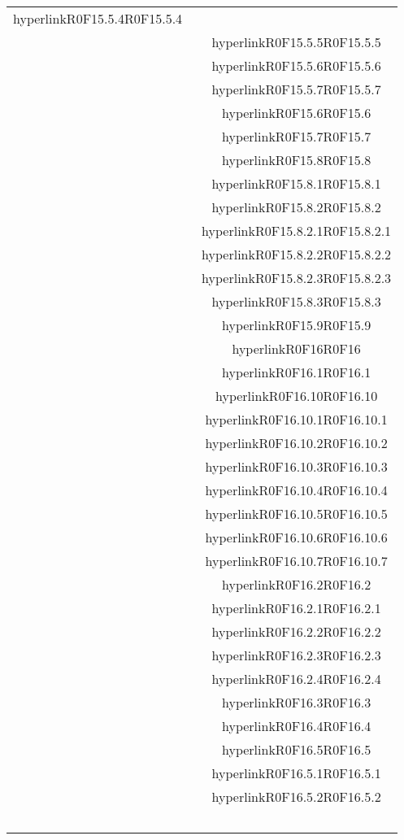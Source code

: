 \documentclass[../AnalisiDeiRequisiti.tex]{subfiles}
\begin{document}
\begin{longtable}{|c|c|}
	hyperlink{R0F15.5.4}{R0F15.5.4}\\& \
	hyperlink{R0F15.5.5}{R0F15.5.5}\\& \
	hyperlink{R0F15.5.6}{R0F15.5.6}\\& \
	hyperlink{R0F15.5.7}{R0F15.5.7}\\& \
	hyperlink{R0F15.6}{R0F15.6}\\& \
	hyperlink{R0F15.7}{R0F15.7}\\& \
	hyperlink{R0F15.8}{R0F15.8}\\& \
	hyperlink{R0F15.8.1}{R0F15.8.1}\\& \
	hyperlink{R0F15.8.2}{R0F15.8.2}\\& \
	hyperlink{R0F15.8.2.1}{R0F15.8.2.1}\\& \
	hyperlink{R0F15.8.2.2}{R0F15.8.2.2}\\& \
	hyperlink{R0F15.8.2.3}{R0F15.8.2.3}\\& \
	hyperlink{R0F15.8.3}{R0F15.8.3}\\& \
	hyperlink{R0F15.9}{R0F15.9}\\& \
	hyperlink{R0F16}{R0F16}\\& \
	hyperlink{R0F16.1}{R0F16.1}\\& \
	hyperlink{R0F16.10}{R0F16.10}\\& \
	hyperlink{R0F16.10.1}{R0F16.10.1}\\& \
	hyperlink{R0F16.10.2}{R0F16.10.2}\\& \
	hyperlink{R0F16.10.3}{R0F16.10.3}\\& \
	hyperlink{R0F16.10.4}{R0F16.10.4}\\& \
	hyperlink{R0F16.10.5}{R0F16.10.5}\\& \
	hyperlink{R0F16.10.6}{R0F16.10.6}\\& \
	hyperlink{R0F16.10.7}{R0F16.10.7}\\& \
	hyperlink{R0F16.2}{R0F16.2}\\& \
	hyperlink{R0F16.2.1}{R0F16.2.1}\\& \
	hyperlink{R0F16.2.2}{R0F16.2.2}\\& \
	hyperlink{R0F16.2.3}{R0F16.2.3}\\& \
	hyperlink{R0F16.2.4}{R0F16.2.4}\\& \
	hyperlink{R0F16.3}{R0F16.3}\\& \
	hyperlink{R0F16.4}{R0F16.4}\\& \
	hyperlink{R0F16.5}{R0F16.5}\\& \
	hyperlink{R0F16.5.1}{R0F16.5.1}\\& \
	hyperlink{R0F16.5.2}{R0F16.5.2}\\& \

\end{longtable}
\end{document}
